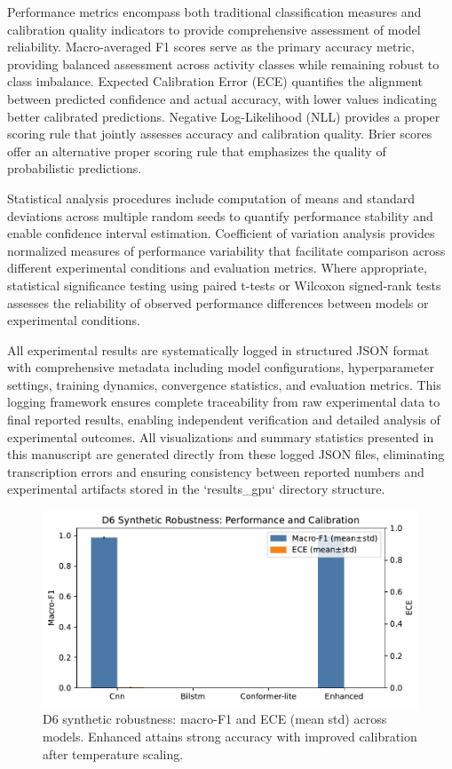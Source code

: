 \documentclass[journal]{IEEEtran}
\begin{document}
Performance metrics encompass both traditional classification measures and calibration quality indicators to provide comprehensive assessment of model reliability. Macro-averaged F1 scores serve as the primary accuracy metric, providing balanced assessment across activity classes while remaining robust to class imbalance. Expected Calibration Error (ECE) quantifies the alignment between predicted confidence and actual accuracy, with lower values indicating better calibrated predictions. Negative Log-Likelihood (NLL) provides a proper scoring rule that jointly assesses accuracy and calibration quality. Brier scores offer an alternative proper scoring rule that emphasizes the quality of probabilistic predictions.

Statistical analysis procedures include computation of means and standard deviations across multiple random seeds to quantify performance stability and enable confidence interval estimation. Coefficient of variation analysis provides normalized measures of performance variability that facilitate comparison across different experimental conditions and evaluation metrics. Where appropriate, statistical significance testing using paired t-tests or Wilcoxon signed-rank tests assesses the reliability of observed performance differences between models or experimental conditions.

All experimental results are systematically logged in structured JSON format with comprehensive metadata including model configurations, hyperparameter settings, training dynamics, convergence statistics, and evaluation metrics. This logging framework ensures complete traceability from raw experimental data to final reported results, enabling independent verification and detailed analysis of experimental outcomes. All visualizations and summary statistics presented in this manuscript are generated directly from these logged JSON files, eliminating transcription errors and ensuring consistency between reported numbers and experimental artifacts stored in the `results_gpu` directory structure.

\begin{figure}[t]
\centering
\includegraphics[width=\columnwidth]{plots/d6_calibration_summary.pdf}
\caption{D6 synthetic robustness: macro-F1 and ECE (mean\,\textpm\,std) across models. Enhanced attains strong accuracy with improved calibration after temperature scaling.}
\label{fig:d6_cal}
\end{figure}
\end{document}
